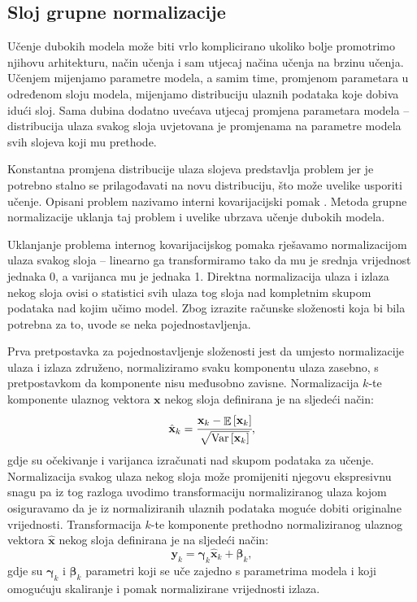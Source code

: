 \documentclass[times, utf8, diplomski, numeric]{fer}
\begin{document}
\subsection{Sloj grupne normalizacije }
Učenje dubokih modela može biti vrlo komplicirano ukoliko bolje promotrimo njihovu arhitekturu, način učenja i sam utjecaj načina učenja na brzinu učenja.
Učenjem mijenjamo parametre modela, a samim time, promjenom parametara u određenom sloju modela, mijenjamo distribuciju ulaznih podataka koje dobiva idući sloj.
Sama dubina dodatno uvećava utjecaj promjena parametara modela -- distribucija ulaza svakog sloja uvjetovana je promjenama na parametre modela svih slojeva koji mu prethode.

Konstantna promjena distribucije ulaza slojeva predstavlja problem jer je potrebno stalno se prilagođavati na novu distribuciju, što može uvelike usporiti učenje.
Opisani problem nazivamo interni kovarijacijski pomak . 
Metoda grupne normalizacije  uklanja taj problem i uvelike ubrzava učenje dubokih modela.

Uklanjanje problema internog kovarijacijskog pomaka rješavamo normalizacijom ulaza svakog sloja -- linearno ga transformiramo tako da mu je srednja vrijednost jednaka 0, a varijanca mu je jednaka 1.
Direktna normalizacija ulaza i izlaza nekog sloja ovisi o statistici svih ulaza tog sloja nad kompletnim skupom podataka nad kojim učimo model.
Zbog izrazite računske složenosti koja bi bila potrebna za to, uvode se neka pojednostavljenja.

Prva pretpostavka za pojednostavljenje složenosti jest da umjesto normalizacije ulaza i izlaza združeno, normaliziramo svaku komponentu ulaza zasebno, s pretpostavkom da komponente nisu međusobno zavisne.
Normalizacija $k$-te komponente ulaznog vektora $\mathbf{x}$ nekog sloja definirana je na sljedeći način:
\begin{equation}
 \hat{\mathbf{x}}_{k} = \cfrac{\mathbf{x}_{k} - \mathop{\mathbb{E}} \left[ \mathbf{x}_{k} \right]} {\sqrt{ \mathrm{Var} \left[ \mathbf{x}_{k} \right] } }, \label{eq:bn_normalization}
\end{equation}
gdje su očekivanje i varijanca izračunati nad skupom podataka za učenje.
Normalizacija svakog ulaza nekog sloja može promijeniti njegovu ekspresivnu snagu pa iz tog razloga uvodimo transformaciju normaliziranog ulaza kojom osiguravamo da je iz normaliziranih ulaznih podataka moguće dobiti originalne vrijednosti.
Transformacija $k$-te komponente prethodno normaliziranog ulaznog vektora $\hat{\mathbf{x}}$ nekog sloja definirana je na sljedeći način:
\begin{equation}
 \mathbf{y}_{k} = \boldsymbol{\gamma}_{k} \hat{\mathbf{x}}_{k} + \boldsymbol{\beta}_{k}, \label{eq:bn_transformation}
\end{equation}
gdje su $\boldsymbol{\gamma}_{k}$ i $\boldsymbol{\beta}_{k}$ parametri koji se uče zajedno s parametrima modela i koji omogućuju skaliranje i pomak normalizirane vrijednosti izlaza.
\end{document}
